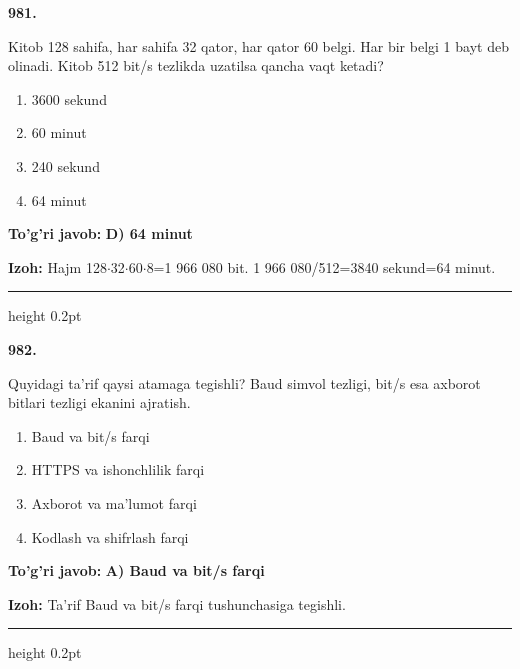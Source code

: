 \documentclass[10pt,a4paper,oneside]{article}
\begin{document}
\noindent\textbf{\color{ink}981.}
\par
Kitob 128 sahifa, har sahifa 32 qator, har qator 60 belgi. Har bir belgi 1 bayt deb olinadi. Kitob 512 bit/s tezlikda uzatilsa qancha vaqt ketadi?
\begin{enumerate}[label=\Alph*),leftmargin=9mm]
\item 3600 sekund
\item 60 minut
\item 240 sekund
\item 64 minut
\end{enumerate}
\begin{tcolorbox}[enhanced,breakable,colback=teal!4,colframe=teal!50!black,boxrule=0.5pt,arc=1.1mm,left=3mm,right=3mm,top=1.7mm,bottom=1.7mm,before skip=2mm,after skip=2mm]
\textbf{\color{teal}To'g'ri javob:} \textbf{D) 64 minut}
\par\smallskip
\textbf{Izoh:} Hajm 128\ensuremath{\cdot}32\ensuremath{\cdot}60\ensuremath{\cdot}8=1 966 080 bit. 1 966 080/512=3840 sekund=64 minut.
\end{tcolorbox}
\vspace{2mm}\hrule height 0.2pt \vspace{3mm}

\noindent\textbf{\color{ink}982.}
\par
Quyidagi ta'rif qaysi atamaga tegishli? Baud simvol tezligi, bit/s esa axborot bitlari tezligi ekanini ajratish.
\begin{enumerate}[label=\Alph*),leftmargin=9mm]
\item Baud va bit/s farqi
\item HTTPS va ishonchlilik farqi
\item Axborot va ma'lumot farqi
\item Kodlash va shifrlash farqi
\end{enumerate}
\begin{tcolorbox}[enhanced,breakable,colback=teal!4,colframe=teal!50!black,boxrule=0.5pt,arc=1.1mm,left=3mm,right=3mm,top=1.7mm,bottom=1.7mm,before skip=2mm,after skip=2mm]
\textbf{\color{teal}To'g'ri javob:} \textbf{A) Baud va bit/s farqi}
\par\smallskip
\textbf{Izoh:} Ta'rif Baud va bit/s farqi tushunchasiga tegishli.
\end{tcolorbox}
\vspace{2mm}\hrule height 0.2pt \vspace{3mm}
\end{document}
